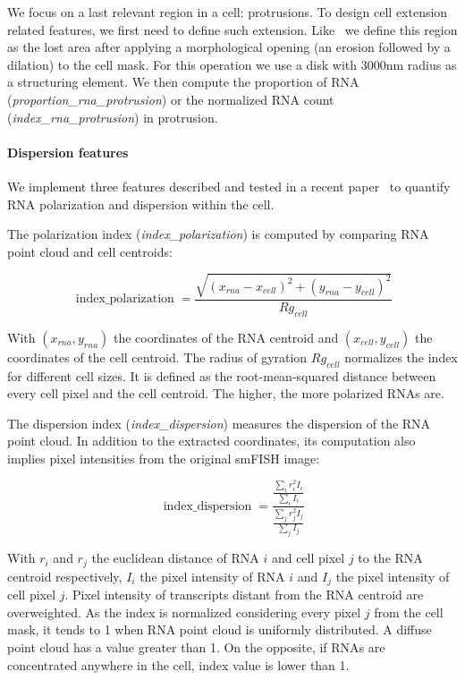 We focus on a last relevant region in a cell: protrusions.
To design cell extension related features, we first need to define such extension.
Like~\cite{samacoits_computational_2018} we define this region as the lost area after applying a morphological opening (an erosion followed by a dilation) to the cell mask.
For this operation we use a disk with 3000nm radius as a structuring element.
We then compute the proportion of \ac{RNA} (\emph{proportion\_rna\_protrusion}) or the normalized \ac{RNA} count (\emph{index\_rna\_protrusion}) in protrusion.

\paragraph{Dispersion features}

We implement three features described and tested in a recent paper~\cite{stueland_rdi_2019} to quantify \ac{RNA} polarization and dispersion within the cell.

The polarization index (\emph{index\_polarization}) is computed by comparing \ac{RNA} point cloud and cell centroids:

\begin{equation}
	{\displaystyle \operatorname{index\_polarization} = \frac{\sqrt{(x_{rna} - x_{cell})^2 + (y_{rna} - y_{cell})^2}}{Rg_{cell}}}
\end{equation}

\noindent
With $(x_{rna}, y_{rna})$ the coordinates of the \ac{RNA} centroid and $(x_{cell}, y_{cell})$ the coordinates of the cell centroid.
The radius of gyration $Rg_{cell}$ normalizes the index for different cell sizes.
It is defined as the root-mean-squared distance between every cell pixel and the cell centroid.
The higher, the more polarized \ac{RNA}s are.

The dispersion index (\emph{index\_dispersion}) measures the dispersion of the \ac{RNA} point cloud.
In addition to the extracted coordinates, its computation also implies pixel intensities from the original \ac{smFISH} image:

\begin{equation}
	{\displaystyle \operatorname{index\_dispersion} = \frac{\frac{\sum_{i} r_i^2 I_i}{\sum_{i} I_i}}{\frac{\sum_{j} r_j^2 I_j}{\sum_{j} I_j}}}
\end{equation}

\noindent
With $r_i$ and $r_j$ the euclidean distance of \ac{RNA} $i$ and cell pixel $j$ to the \ac{RNA} centroid respectively, $I_i$ the pixel intensity of \ac{RNA} $i$ and $I_j$ the pixel intensity of cell pixel $j$.
Pixel intensity of transcripts distant from the \ac{RNA} centroid are overweighted.
As the index is normalized considering every pixel $j$ from the cell mask, it tends to 1 when \ac{RNA} point cloud is uniformly distributed.
A diffuse point cloud has a value greater than 1.
On the opposite, if \ac{RNA}s are concentrated anywhere in the cell, index value is lower than 1.

